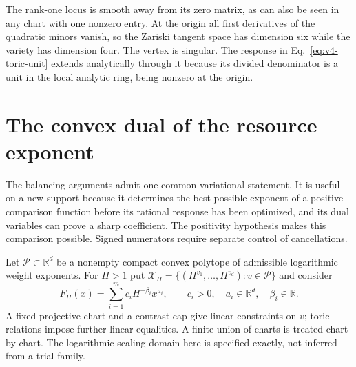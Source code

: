 \documentclass[aps,pre,reprint,amsmath,amssymb,longbibliography]{revtex4-2}
\begin{document}
The rank-one locus is smooth away from its zero matrix, as can also be
seen in any chart with one nonzero entry. At the origin all first
derivatives of the quadratic minors vanish, so the Zariski tangent
space has dimension six while the variety has dimension four. The
vertex is singular. The response in Eq.~\eqref{eq:v4-toric-unit}
extends analytically through it because its divided denominator is a
unit in the local analytic ring, being nonzero at the origin.

\section{The convex dual of the resource exponent}\label{app:v4-newton-dual}
\label{v4:payoff:newton-dual}

The balancing arguments admit one common variational statement. It is
useful on a new support because it determines the best possible exponent
of a positive comparison function before its rational response has been
optimized, and its dual variables can prove a sharp coefficient. The
positivity hypothesis makes this comparison possible. Signed
numerators require separate control of cancellations.

Let $\mathcal P\subset\mathbb R^d$ be a nonempty compact convex polytope
of admissible logarithmic weight exponents. For $H>1$ put
$\mathcal X_H=\{(H^{v_1},\ldots,H^{v_d}):v\in\mathcal P\}$ and consider
\begin{equation}\label{v4:payoff:posynomial}
 F_H(x)=\sum_{i=1}^m c_i H^{-\beta_i}x^{a_i},
 \qquad c_i>0,\quad a_i\in\mathbb R^d,\quad \beta_i\in\mathbb R.
\end{equation}
A fixed projective chart and a contrast cap give linear constraints on
$v$; toric relations impose further linear equalities. A finite union of
charts is treated chart by chart. The logarithmic scaling domain here is
specified exactly, not inferred from a trial family.
\end{document}
